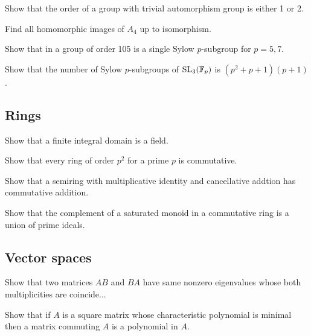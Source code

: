 \documentclass[12pt]{article}
\begin{document}
	\begin{prb}
	Show that the order of a group with trivial automorphism group is either 1 or 2.
	\end{prb}

	\begin{prb}
	Find all homomorphic images of $A_4$ up to isomorphism.
	\end{prb}

	\begin{prb}
	Show that in a group of order 105 is a single Sylow $p$-subgroup for $p=5,7$.
	\end{prb}

	\begin{prb}
	Show that the number of Sylow $p$-subgroups of $\mathrm{SL}_3(\mathbb{F}_p)$ is $(p^2+p+1)(p+1)$.
	\end{prb}

	\subsection{Rings}
	\begin{prb}
	Show that a finite integral domain is a field.
	\end{prb}

	\begin{prb}
	Show that every ring of order $p^2$ for a prime $p$ is commutative.
	\end{prb}

	\begin{prb}
	Show that a semiring with multiplicative identity and cancellative addtion has commutative addition.
	\end{prb}

	\begin{prb}
	Show that the complement of a saturated monoid in a commutative ring is a union of prime ideals.
	\end{prb}

	\subsection{Vector spaces}

	\begin{prb}
	Show that two matrices $AB$ and $BA$ have same nonzero eigenvalues whose both multiplicities are coincide...
	\end{prb}

	\begin{prb}
	Show that if $A$ is a square matrix whose characteristic polynomial is minimal then a matrix commuting $A$ is a polynomial in $A$.
	\end{prb}
\end{document}
